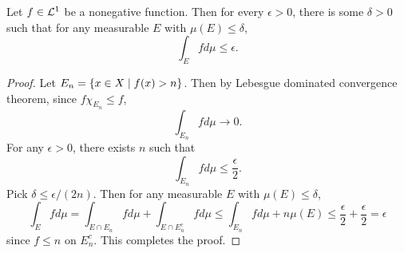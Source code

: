 \begin{proposition}\label{prop:int_abs_conti}
    Let $f\in\mathcal{L}^1$ be a nonegative function. Then for every 
    $\epsilon>0$, there is some $\delta>0$ such that for 
    any measurable $E$ with $\mu(E)\leq\delta$, 
    \begin{equation*}
        \int_E fd\mu \leq \epsilon.
    \end{equation*} 
\end{proposition}
\begin{proof}
    Let $E_n = \left\{ x\in X \;\middle\vert\; f(x)>n \right\}$. Then by Lebesgue 
    dominated convergence theorem, since $f\chi_{E_n}\leq f$,
    \begin{equation*}
        \int_{E_n}fd\mu \to 0.
    \end{equation*}
    For any $\epsilon>0$, there exists $n$ such that 
    \begin{equation*}
        \int_{E_n}fd\mu \leq \frac{\epsilon}{2}.
    \end{equation*}
    Pick $\delta\leq \epsilon/(2n)$. Then for any measurable 
    $E$ with $\mu(E)\leq\delta$, 
    \begin{equation*}
        \int_E fd\mu = \int_{E\cap E_n}fd\mu + \int_{E\cap E_n^c}fd\mu 
        \leq \int_{E_n}fd\mu + n\mu(E) \leq \frac{\epsilon}{2} + \frac{\epsilon}{2} = \epsilon
    \end{equation*}
    since $f\leq n$ on $E_n^c$. This completes the proof.
\end{proof}

